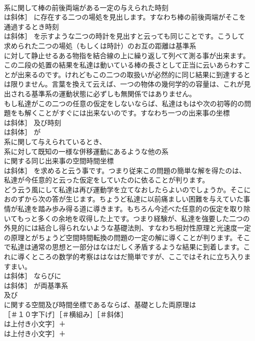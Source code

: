\documentclass[8pt]{extreport}
\begin{document}
\begin{CJK}{UTF8}{min}
\\	系に関して棒の前後両端がある一定の与えられた時刻 
\\	は斜体］ に存在する二つの場処を見出します。すなわち棒の前後両端がそこを通過するとき時刻 
\\	は斜体］ を示すような二つの時計を見出すと云っても同じことです。こうして求められた二つの場処（もしくは時計）のお互の距離は基準系 
\\	に対して静止せるある物指を結合線の上に繰り返して列べて測る事が出来ます。この二段の処置の結果を私達は動いている棒の長さとして正当に云いあらわすことが出来るのです。けれどもこの二つの取扱いが必然的に同じ結果に到達するとは限りません。言葉を換えて云えば、一つの物体の幾何学的の容量は、これが見出される基準系の運動状態に必ずしも無関係ではありません。
\\	もし私達がこの二つの任意の仮定をしないならば、私達はもはや次の初等的の問題をも解くことがすぐには出来ないのです。すなわち一つの出来事の坐標 
\\	は斜体］ 及び時刻 
\\	は斜体］ が 
\\	系に関して与えられているとき、
\\	系に対して既知の一様な併移運動にあるような他の系 
\\	に関する同じ出来事の空間時間坐標 
\\	は斜体］ を求めると云う事です。つまり従来この問題の簡単な解を得たのは、私達が今任意的と云った仮定をしていたのに依ることが判ります。
\\	どう云う風にして私達は再び運動学を立てなおしたらよいのでしょうか。そこにおのずから次の答が生じます。ちょうど私達に以前痛ましい困難を与えていた事情が私達を踏み歩み得る道に導きます。もちろん今述べた任意的の仮定を取り除いてもっと多くの余地を収得した上です。つまり経験が、私達を強要した二つの外見的には結合し得られないような基礎法則、すなわち相対性原理と光速度一定の原理とがちょうど空間時間転換の問題の一定の解に導くことが判ります。そこで私達は通常の思想と一部分はなはだしく矛盾するような結果に到着します。これに導くところの数学的考察ははなはだ簡単ですが、ここではそれに立ち入りますまい。
\\	は斜体］ ならびに 
\\	は斜体］ が両基準系 
\\	及び 
\\	に関する空間及び時間坐標であるならば、基礎とした両原理は
\\	［＃１０字下げ］［＃横組み］［＃斜体］
\\	は上付き小文字］＋
\\	は上付き小文字］＋

\end{CJK}
\end{document}
